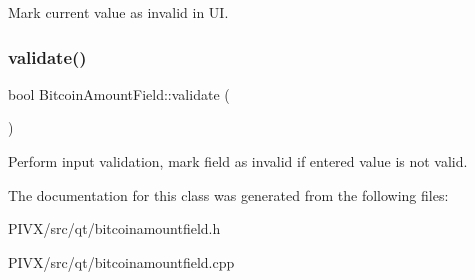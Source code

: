 Mark current value as invalid in UI. \mbox{\label{class_bitcoin_amount_field_a87e6f2d15150baf5962acf7d7151610d}} 
\subsubsection{\texorpdfstring{validate()}{validate()}}
{\footnotesize\ttfamily bool Bitcoin\+Amount\+Field\+::validate (\begin{DoxyParamCaption}{ }\end{DoxyParamCaption})}

Perform input validation, mark field as invalid if entered value is not valid. 

The documentation for this class was generated from the following files\+:\begin{DoxyCompactItemize}
\item 
P\+I\+V\+X/src/qt/bitcoinamountfield.\+h\item 
P\+I\+V\+X/src/qt/bitcoinamountfield.\+cpp\end{DoxyCompactItemize}
